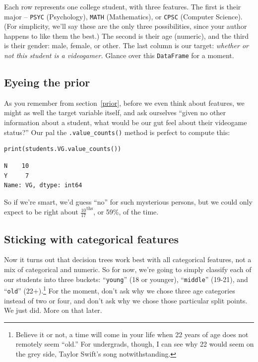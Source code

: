 
Each row represents one college student, with three features. The first is
their major -- \texttt{PSYC} (Psychology), \texttt{MATH} (Mathematics), or
\texttt{CPSC} (Computer Science). (For simplicity, we'll say these are the only
three possibilities, since your author happens to like them the best.) The
second is their age (numeric), and the third is their gender: male, female, or
other. The last column is our target: \textit{whether or not this student is a
videogamer.} Glance over this \texttt{DataFrame} for a moment.

\subsection{Eyeing the prior}


As you remember from section~\ref{prior}, before we even think about features,
we might as well the target variable itself, and ask ourselves ``given no other
information about a student, what would be our gut feel about their videogame
status?'' Our pal the \texttt{.value\_counts()} method is perfect to compute
this:

\begin{Verbatim}[fontsize=\small,samepage=true,frame=single,framesep=3mm]
print(students.VG.value_counts())
\end{Verbatim}
\vspace{-.2in}

\begin{Verbatim}[fontsize=\small,samepage=true,frame=leftline,framesep=5mm,framerule=1mm]
N    10
Y     7
Name: VG, dtype: int64
\end{Verbatim}

So if we're smart, we'd guess ``no'' for such mysterious persons, but we could
only expect to be right about $\frac{10}{17}^\textrm{ths}$, or 59\%, of the
time.

\subsection{Sticking with categorical features}


Now it turns out that decision trees work best with all categorical features,
not a mix of categorical and numeric. So for now, we're going to simply
classify each of our students into three buckets: ``\texttt{young}'' (18 or
younger), ``\texttt{middle}'' (19-21), and ``\texttt{old}''
(22+).\footnote{ Believe it or not, a time will come in
your life when 22 years of age does not remotely seem ``old.'' For undergrads,
though, I can see why 22 would seem on the grey side, Taylor Swift's song
notwithstanding.} For the moment, don't ask why we chose three age categories
instead of two or four, and don't ask why we chose those particular split
points. We just did. More on that later.

